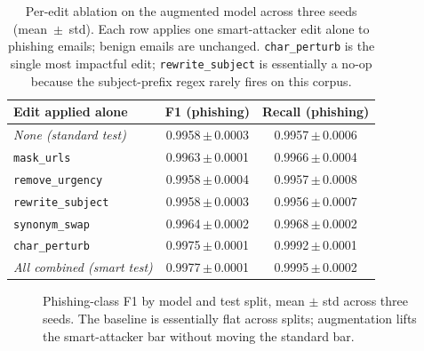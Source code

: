 \documentclass[conference]{IEEEtran}
\begin{document}
\begin{table}[t]
\caption{Per-edit ablation on the augmented model across three seeds
(mean~$\pm$~std). Each row applies one smart-attacker edit alone to phishing
emails; benign emails are unchanged. \texttt{char\_perturb} is the
single most impactful edit; \texttt{rewrite\_subject} is essentially a no-op
because the subject-prefix regex rarely fires on this corpus.}
\label{tab:ablation}
\centering
\begin{tabular}{lcc}
\toprule
\textbf{Edit applied alone} & \textbf{F1 (phishing)} & \textbf{Recall (phishing)} \\
\midrule
\textit{None (standard test)}      & 0.9958\,$\pm$\,0.0003 & 0.9957\,$\pm$\,0.0006 \\
\texttt{mask\_urls}                & 0.9963\,$\pm$\,0.0001 & 0.9966\,$\pm$\,0.0004 \\
\texttt{remove\_urgency}           & 0.9958\,$\pm$\,0.0004 & 0.9957\,$\pm$\,0.0008 \\
\texttt{rewrite\_subject}          & 0.9958\,$\pm$\,0.0003 & 0.9956\,$\pm$\,0.0007 \\
\texttt{synonym\_swap}             & 0.9964\,$\pm$\,0.0002 & 0.9968\,$\pm$\,0.0002 \\
\texttt{char\_perturb}             & 0.9975\,$\pm$\,0.0001 & 0.9992\,$\pm$\,0.0001 \\
\textit{All combined (smart test)} & 0.9977\,$\pm$\,0.0001 & 0.9995\,$\pm$\,0.0002 \\
\bottomrule
\end{tabular}
\end{table}

\begin{figure}[t]
\centering
{}
\caption{Phishing-class F1 by model and test split, mean $\pm$ std across
three seeds. The baseline is essentially flat across splits; augmentation
lifts the smart-attacker bar without moving the standard bar.}
\label{fig:headline}
\end{figure}
\end{document}
